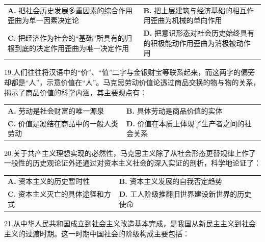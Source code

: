 \documentclass[UTF8,11pt]{ctexart}
\begin{document}
\begin{center}\begin{tabular}{>{\raggedright\arraybackslash}p{\dimexpr(\linewidth-4\tabcolsep)/2\relax}>{\raggedright\arraybackslash}p{\dimexpr(\linewidth-4\tabcolsep)/2\relax}}
\textbf{A.} 把社会历史发展多重因素的综合作用歪曲为单一因素决定论 & \textbf{B.} 把上层建筑与经济基础的相互作用歪曲为机械的单向作用\\[.35em]
\textbf{C.} 把经济作为社会的“基础”所具有的归根到底的决定作用歪曲为唯一决定作用 & \textbf{D.} 把意识形态对社会历史始终具有的积极能动作用歪曲为消极被动作用\\[.35em]\end{tabular}\end{center}

19.人们往往将汉语中的“价”、“值”二字与金银财宝等联系起来，而这两字的偏旁却都是“人”，示意价值在“人”。马克思劳动价值论透过商品交换的物与物的关系，揭示了商品价值的科学内涵，其主要观点有：


\begin{center}\begin{tabular}{>{\raggedright\arraybackslash}p{\dimexpr(\linewidth-4\tabcolsep)/2\relax}>{\raggedright\arraybackslash}p{\dimexpr(\linewidth-4\tabcolsep)/2\relax}}
\textbf{A.} 劳动是社会财富的唯一源泉 & \textbf{B.} 具体劳动是商品价值的实体\\[.35em]
\textbf{C.} 价值是凝结在商品中的一般人类劳动 & \textbf{D.} 价值在本质上体现了生产者之间的社会关系\\[.35em]\end{tabular}\end{center}

20.关于共产主义理想实现的必然性，马克思主义除了从社会形态更替规律上作了一般性的历史观论证外还通过对资本主义社会的深入实证的剖析，科学地论证了：


\begin{center}\begin{tabular}{>{\raggedright\arraybackslash}p{\dimexpr(\linewidth-4\tabcolsep)/2\relax}>{\raggedright\arraybackslash}p{\dimexpr(\linewidth-4\tabcolsep)/2\relax}}
\textbf{A.} 资本主义的历史暂时性 & \textbf{B.} 资本主义发展的自我否定趋势\\[.35em]
\textbf{C.} 资本主义灭亡的具体途径和方式 & \textbf{D.} 工人阶级推翻旧世界建设新世界的历史使命\\[.35em]\end{tabular}\end{center}

21.从中华人民共和国成立到社会主义改造基本完成，是我国从新民主主义到社会主义的过渡时期。这一时期中国社会的阶级构成主要包括：
\end{document}
